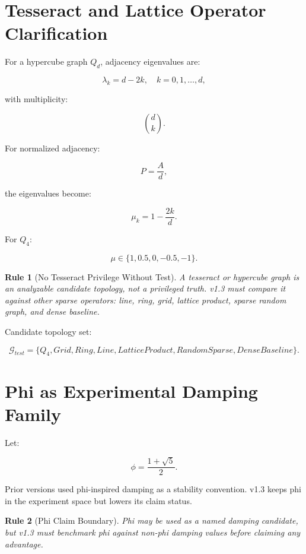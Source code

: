 \documentclass[12pt]{article}
\newtheorem{rulebox}{Rule}
\begin{document}
\section{Tesseract and Lattice Operator Clarification}

For a hypercube graph \(Q_d\), adjacency eigenvalues are:

\[
\lambda_k=d-2k,
\quad k=0,1,\ldots,d,
\]

with multiplicity:

\[
\binom{d}{k}.
\]

For normalized adjacency:

\[
P=\frac{A}{d},
\]

the eigenvalues become:

\[
\mu_k=1-\frac{2k}{d}.
\]

For \(Q_4\):

\[
\mu\in\{1,0.5,0,-0.5,-1\}.
\]

\begin{rulebox}[No Tesseract Privilege Without Test]
A tesseract or hypercube graph is an analyzable candidate topology, not a
privileged truth. v1.3 must compare it against other sparse operators: line,
ring, grid, lattice product, sparse random graph, and dense baseline.
\end{rulebox}

Candidate topology set:

\[
\mathcal{G}_{test}
=
\{Q_4,Grid,Ring,Line,LatticeProduct,RandomSparse,DenseBaseline\}.
\]

\section{Phi as Experimental Damping Family}

Let:

\[
\phi=\frac{1+\sqrt{5}}{2}.
\]

Prior versions used phi-inspired damping as a stability convention. v1.3 keeps
phi in the experiment space but lowers its claim status.

\begin{rulebox}[Phi Claim Boundary]
Phi may be used as a named damping candidate, but v1.3 must benchmark phi
against non-phi damping values before claiming any advantage.
\end{rulebox}
\end{document}
